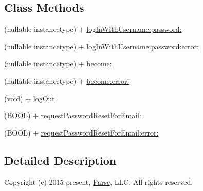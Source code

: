 \subsection*{Class Methods}
\begin{DoxyCompactItemize}
\item 
(nullable instancetype) + \hyperlink{category_p_f_user_07_synchronous_08_a06f636e0dff66c01a9f4d7f4fea2a0df}{log\+In\+With\+Username\+:password\+:}
\begin{DoxyCompactList}\small\item\em 

 \end{DoxyCompactList}\item 
(nullable instancetype) + \hyperlink{category_p_f_user_07_synchronous_08_ab991742674c9423ba9c33c5e8f659b66}{log\+In\+With\+Username\+:password\+:error\+:}
\item 
(nullable instancetype) + \hyperlink{category_p_f_user_07_synchronous_08_a7f17b20a2be8a66cdcd8952630be3421}{become\+:}
\begin{DoxyCompactList}\small\item\em 

 \end{DoxyCompactList}\item 
(nullable instancetype) + \hyperlink{category_p_f_user_07_synchronous_08_a870f7ba0bcd5b3b484388b6ca59e71c7}{become\+:error\+:}
\item 
(void) + \hyperlink{category_p_f_user_07_synchronous_08_af8cba49d3efea923f8d8ae7c3c03bf1a}{log\+Out}
\begin{DoxyCompactList}\small\item\em 

 \end{DoxyCompactList}\item 
(B\+O\+O\+L) + \hyperlink{category_p_f_user_07_synchronous_08_a985f5e70663378c45ea743f4d4822e6e}{request\+Password\+Reset\+For\+Email\+:}
\begin{DoxyCompactList}\small\item\em 

 \end{DoxyCompactList}\item 
(B\+O\+O\+L) + \hyperlink{category_p_f_user_07_synchronous_08_a642ae36845466ae5f9f2db9674a0ab36}{request\+Password\+Reset\+For\+Email\+:error\+:}
\end{DoxyCompactItemize}


\subsection{Detailed Description}
Copyright (c) 2015-\/present, \hyperlink{interface_parse}{Parse}, L\+L\+C. All rights reserved.

